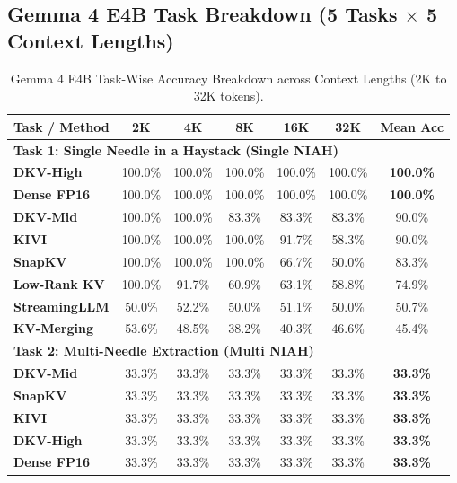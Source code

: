 \documentclass[10pt]{article}
\theoremstyle{definition}
\begin{document}
\clearpage
\subsection{Gemma 4 E4B Task Breakdown (5 Tasks \texorpdfstring{$\times$}{x} 5 Context Lengths)}

\begin{table}[h]
\vspace{6pt}
\centering
\small
\caption{Gemma 4 E4B Task-Wise Accuracy Breakdown across Context Lengths (2K to 32K tokens).}
\label{tab:e4b_task_breakdown}
\begin{tabular}{lcccccc}
\toprule
\textbf{Task / Method} & \textbf{2K} & \textbf{4K} & \textbf{8K} & \textbf{16K} & \textbf{32K} & \textbf{Mean Acc} \\
\midrule
\multicolumn{7}{l}{\textbf{Task 1: Single Needle in a Haystack (Single NIAH)}} \\
\textbf{DKV-High} & 100.0\% & 100.0\% & 100.0\% & 100.0\% & 100.0\% & \textbf{100.0\%} \\
\textbf{Dense FP16} & 100.0\% & 100.0\% & 100.0\% & 100.0\% & 100.0\% & \textbf{100.0\%} \\
\textbf{DKV-Mid} & 100.0\% & 100.0\% & 83.3\% & 83.3\% & 83.3\% & 90.0\% \\
\textbf{KIVI} & 100.0\% & 100.0\% & 100.0\% & 91.7\% & 58.3\% & 90.0\% \\
\textbf{SnapKV} & 100.0\% & 100.0\% & 100.0\% & 66.7\% & 50.0\% & 83.3\% \\
\textbf{Low-Rank KV} & 100.0\% & 91.7\% & 60.9\% & 63.1\% & 58.8\% & 74.9\% \\
\textbf{StreamingLLM} & 50.0\% & 52.2\% & 50.0\% & 51.1\% & 50.0\% & 50.7\% \\
\textbf{KV-Merging} & 53.6\% & 48.5\% & 38.2\% & 40.3\% & 46.6\% & 45.4\% \\
\midrule
\multicolumn{7}{l}{\textbf{Task 2: Multi-Needle Extraction (Multi NIAH)}} \\
\textbf{DKV-Mid} & 33.3\% & 33.3\% & 33.3\% & 33.3\% & 33.3\% & \textbf{33.3\%} \\
\textbf{SnapKV} & 33.3\% & 33.3\% & 33.3\% & 33.3\% & 33.3\% & \textbf{33.3\%} \\
\textbf{KIVI} & 33.3\% & 33.3\% & 33.3\% & 33.3\% & 33.3\% & \textbf{33.3\%} \\
\textbf{DKV-High} & 33.3\% & 33.3\% & 33.3\% & 33.3\% & 33.3\% & \textbf{33.3\%} \\
\textbf{Dense FP16} & 33.3\% & 33.3\% & 33.3\% & 33.3\% & 33.3\% & \textbf{33.3\%} \\

\end{tabular}
\end{table}
\end{document}
